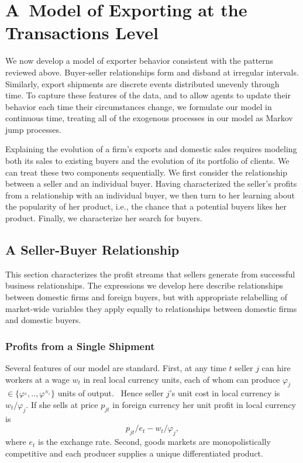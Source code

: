 \section{A\ Model of Exporting at the Transactions Level}

We now develop a model of exporter behavior consistent with the patterns
reviewed above. Buyer-seller relationships form and disband at irregular
intervals. Similarly, export shipments are discrete events distributed
unevenly through time. To capture these features of the data, and to allow
agents to update their behavior each time their circumstances change, we
formulate our model in continuous time, treating all of the exogenous
processes in our model as Markov jump processes.

Explaining the evolution of a firm's exports and domestic sales requires
modeling both its sales to existing buyers and the evolution of its
portfolio of clients. We can treat these two components sequentially. We
first consider the relationship between a seller and an individual buyer.
Having characterized the seller's profits from a relationship with an
individual buyer, we then turn to her learning about the popularity of her
product, i.e., the chance that a potential buyers likes her product.
Finally, we characterize her search for buyers.





\subsection{A Seller-Buyer Relationship}

This section characterizes the profit streams that sellers generate from
successful business relationships. The expressions we develop here describe
relationships between domestic firms and foreign buyers, but with
appropriate relabelling of market-wide variables they apply equally to
relationships between domestic firms and domestic buyers.

\subsubsection{Profits from a Single Shipment}

Several features of our model are standard. First, at any time $t$ seller $j$
can hire workers at a wage $w_{t}$ in real local currency units, each of
whom can produce $\varphi _{j}$ $\in \{\varphi ^{_{1}},..,\varphi
^{_{N_{\varphi }}}\}$ units of output.\footnotemark{} \ Hence seller $j$'s unit cost in local currency is $%
w_{t}/\varphi _{j}.$ If she sells at price $p_{jt}$ in foreign currency her
unit profit in local currency is%
\begin{equation}
p_{jt}/e_{t}-w_{t}/\varphi _{j},  \label{unit profit}
\end{equation}%
where $e_{t}$ is the exchange rate. Second, goods markets are
monopolistically competitive and each producer supplies a unique
differentiated product.


